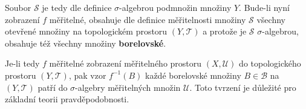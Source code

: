 	Soubor $\mathscr{S}$ je tedy dle definice $\sigma$-algebrou podmnožin množiny $Y$. Bude-li nyní zobrazení $f$ měřitelné, obsahuje dle definice měřitelnosti množiny $\mathscr{S}$ všechny otevřené množiny na topologickém prostoru $(Y,\mathscr{T})$ a protože je $\mathscr{S}$ $\sigma$-algebrou, obsahuje též všechny množiny \textbf{borelovské}.\br
	
	Je-li tedy $f$ měřitelné zobrazení měřitelného prostoru $(X,\mathscr{U})$ do topologického prostoru $(Y,\mathscr{T})$,  pak vzor $f^{-1}(B)$ každé borelovské množiny $B\in\mathscr{B}$ na $(Y,\mathscr{T})$ patří do $\sigma$-algebry měřitelných množin $\mathscr{U}$. Toto tvrzení je důležité pro základní teorii pravděpodobnosti.